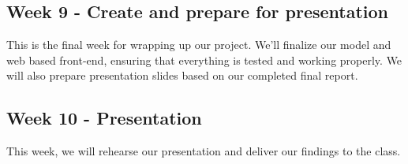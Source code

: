 \documentclass[11pt]{article}
\begin{document}
\subsection*{Week 9 - Create and prepare for presentation}
This is the final week for wrapping up our project. We’ll finalize our model and web based front-end, ensuring that everything is tested and working properly. We will also prepare presentation slides based on our completed final report. 

\subsection*{Week 10 - Presentation}
This week, we will rehearse our presentation and deliver our findings to the class.
\end{document}
